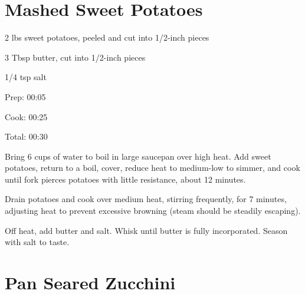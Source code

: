 \documentclass[oneside]{book}  %
\def\thisrecipe{}  %
\newcommand{\recipe}[1]{\section{#1}\def\thisrecipe{: #1}} %
\begin{document}


\recipe{Mashed Sweet Potatoes} \label{recipe:mashed_sweet_potatoes} %

\begin{IT}
  \begin{ingredients}
    \item[2 lbs] sweet potatoes, peeled and cut into 1/2-inch pieces
    \item[3 Tbsp] butter, cut into 1/2-inch pieces
    \item[1/4 tsp] salt
  \end{ingredients}

  \switchcolumn

  \begin{timeline}
    \item[Prep:]  00:05
    \item[Cook:]  00:25
    \item[Total:] 00:30
  \end{timeline}
\end{IT}

\begin{directions}
  \item Bring 6 cups of water to boil in large saucepan over high heat. Add
  sweet potatoes, return to a boil, cover, reduce heat to medium-low to simmer,
  and cook until fork pierces potatoes with little resistance, about 12 minutes.

  \item Drain potatoes and cook over medium heat, stirring frequently, for 7
  minutes, adjusting heat to prevent excessive browning (steam should be
  steadily escaping).

  \item Off heat, add butter and salt. Whisk until butter is fully incorporated.
  Season with salt to taste.
\end{directions}
\recipe{Pan Seared Zucchini} \label{recipe:pan_seared_zucchini} %
\end{document}
